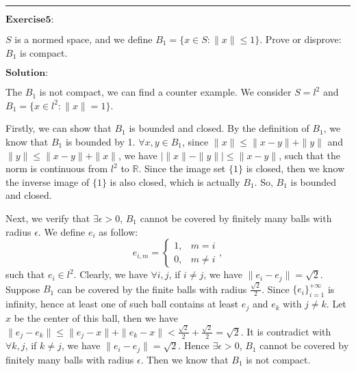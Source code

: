 \documentclass[12pt]{article}
\begin{document}
\vspace{8pt}

\noindent\rule[0.25\baselineskip]{\textwidth}{0.5pt}

$\textbf{Exercise5:}$

$S$ is a normed space, and we define $B_{1} = \{ x \in S: \|x\| \leq 1 \}$. Prove or disprove: $B_{1}$ is compact.

\vspace{8pt}
$\textbf{Solution:}$

The $B_{1}$ is not compact, we can find a counter example. We consider $S = l^{2}$ and $B_{1} = \{ x \in l^{2}: \|x\| = 1 \}$. 

Firstly, we can show that $B_{1}$ is bounded and closed. By the definition of $B_{1}$, we know that $B_{1}$ is bounded by 1. $\forall x, y \in B_{1}$, since $\|x\| \leq \|x - y \| + \|y\|$ and $\|y\| \leq \|x - y \| + \|x\|$, we have $| \|x\| - \|y\| | \leq \|x - y\|$, such that the norm is continuous from $l^{2}$ to $\mathbb{R}$. Since the image set $\{1\}$ is closed, then we know the inverse image of $\{1\}$ is also closed, which is actually $B_{1}$. So, $B_{1}$ is bounded and closed.

Next, we verify that $\exists \epsilon > 0$, $B_{1}$ cannot be covered by finitely many balls with radius $\epsilon$. We define $e_{i}$ as follow:
\begin{equation*}
e_{i,m} =
\left\{
             \begin{array}{cl}
             1, & m = i \\
             0, & m \neq i
             \end{array},
\right.
\end{equation*}
such that $e_{i} \in l^{2}$. Clearly, we have $\forall i, j$, if $i \neq j$,  we have  $\|e_{i} - e_{j} \| = \sqrt{2}$. Suppose $B_{1}$ can be covered by the finite balls with radius $\frac{\sqrt{2}}{2}$. Since $\{e_{i}\}_{i = 1}^{+ \infty}$ is infinity, hence at least one of such ball contains at least $e_{j}$ and $e_{k}$ with $j \neq k$. Let $x$ be the center of this ball, then we have $\|e_{j}  - e_{k}\| \leq \|e_{j} - x\| + \|e_{k} - x\| < \frac{\sqrt{2}}{2} + \frac{\sqrt{2}}{2} =  \sqrt{2}$. It is contradict with $\forall k, j$, if $k \neq j$,  we have  $\|e_{i} - e_{j} \| = \sqrt{2}$. Hence $\exists \epsilon > 0$, $B_{1}$ cannot be covered by finitely many balls with radius $\epsilon$. Then we know  that $B_{1}$ is  not compact.
\end{document}
